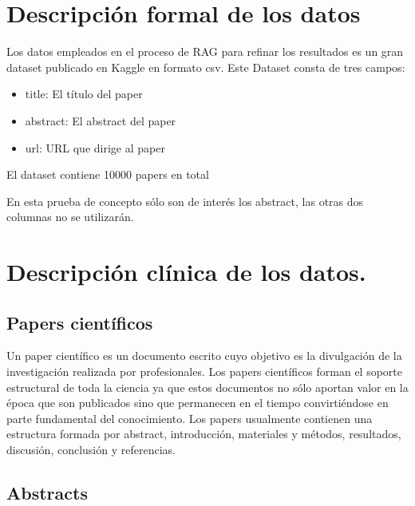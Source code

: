 

\section{Descripción formal de los datos}

Los datos empleados en el proceso de RAG para refinar los resultados es un gran dataset publicado en Kaggle en formato csv. Este Dataset consta de tres campos:

\begin{itemize}

    \item title: El título del paper
    \item abstract: El abstract del paper
    \item url: URL que dirige al paper

\end{itemize}

El dataset contiene 10000 papers en total

En esta prueba de concepto sólo son de interés los abstract, las otras dos columnas no se utilizarán.

    
\section{Descripción clínica de los datos.}

\subsection{Papers científicos}

Un paper científico es un documento escrito cuyo objetivo es la divulgación de la investigación realizada por profesionales. Los papers científicos forman el soporte estructural de toda la ciencia ya que estos documentos no sólo aportan valor en la época que son publicados sino que permanecen en el tiempo convirtiéndose en parte fundamental del conocimiento.
Los papers usualmente contienen una estructura formada por abstract, introducción, materiales y métodos, resultados, discusión, conclusión y referencias. %

\subsection{Abstracts}

